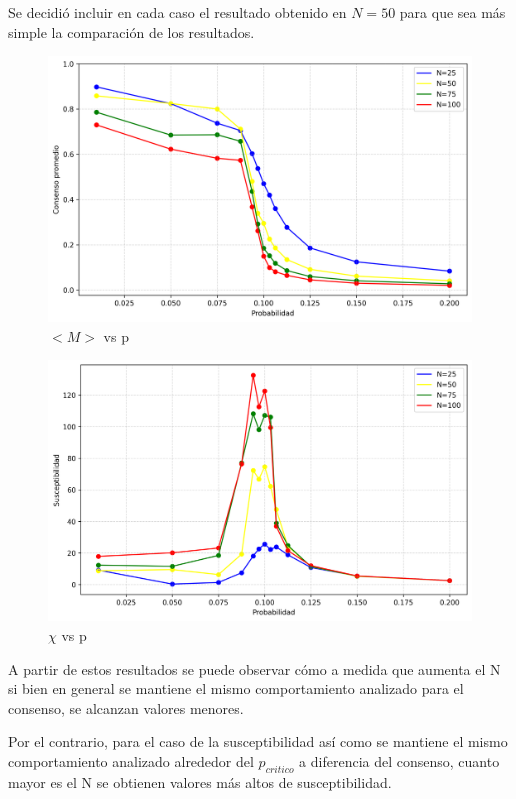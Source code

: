 \documentclass[12pt]{article}
\begin{document}
Se decidió incluir en cada caso el resultado obtenido en $N = 50$ para que sea más simple la comparación de los resultados.

\begin{figure}[H]
    \centering
    \includegraphics[width=1\textwidth]{magnetization_mean_comparison.png} 
    \caption{$< M>$ vs p}
\end{figure}

\begin{figure}[H]
    \centering
    \includegraphics[width=1\textwidth]{susceptibilities_comparison.png} 
    \caption{$\chi$ vs p}
\end{figure}

A partir de estos resultados se puede observar cómo a medida que aumenta el N si bien en general se mantiene el mismo comportamiento analizado para el consenso, se alcanzan valores menores. 

Por el contrario, para el caso de la susceptibilidad así como se mantiene el mismo comportamiento analizado alrededor del $p_{critico}$ a diferencia del consenso, cuanto mayor es el N se obtienen valores más altos de susceptibilidad.
\end{document}
